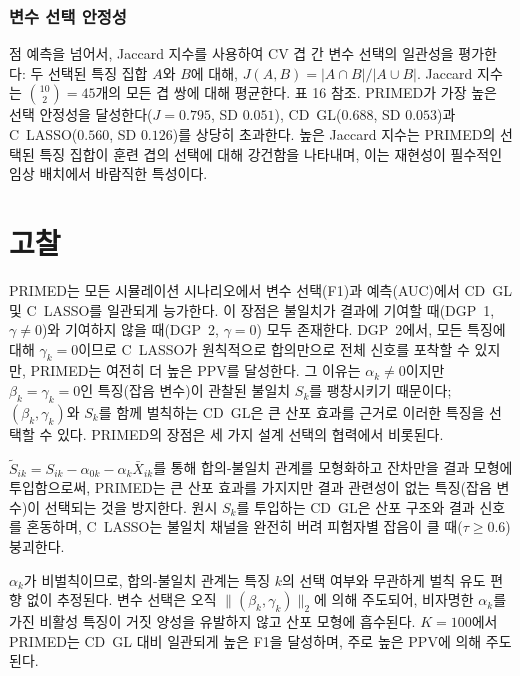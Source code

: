 \documentclass[a4paper,11pt]{article}
\begin{document}
\subsubsection{변수 선택 안정성}

점 예측을 넘어서, Jaccard 지수를 사용하여 CV 겹 간 변수 선택의 일관성을 평가한다: 두 선택된 특징 집합 $A$와 $B$에 대해, $J(A, B) = |A \cap B| / |A \cup B|$.
Jaccard 지수는 $\binom{10}{2} = 45$개의 모든 겹 쌍에 대해 평균한다.
표 16 참조.
PRIMED가 가장 높은 선택 안정성을 달성한다($J = 0.795$, SD $0.051$), CD~GL($0.688$, SD $0.053$)과 C~LASSO($0.560$, SD $0.126$)를 상당히 초과한다.
높은 Jaccard 지수는 PRIMED의 선택된 특징 집합이 훈련 겹의 선택에 대해 강건함을 나타내며, 이는 재현성이 필수적인 임상 배치에서 바람직한 특성이다.

\section{고찰}\label{sec:discussion}

PRIMED는 모든 시뮬레이션 시나리오에서 변수 선택(F1)과 예측(AUC)에서 CD~GL 및 C~LASSO를 일관되게 능가한다.
이 장점은 불일치가 결과에 기여할 때(DGP~1, $\gamma \neq 0$)와 기여하지 않을 때(DGP~2, $\gamma = 0$) 모두 존재한다.
DGP~2에서, 모든 특징에 대해 $\gamma_k = 0$이므로 C~LASSO가 원칙적으로 합의만으로 전체 신호를 포착할 수 있지만, PRIMED는 여전히 더 높은 PPV를 달성한다.
그 이유는 $\alpha_k \neq 0$이지만 $\beta_k = \gamma_k = 0$인 특징(잡음 변수)이 관찰된 불일치 $S_k$를 팽창시키기 때문이다; $(\beta_k, \gamma_k)$와 $S_k$를 함께 벌칙하는 CD~GL은 큰 산포 효과를 근거로 이러한 특징을 선택할 수 있다.
PRIMED의 장점은 세 가지 설계 선택의 협력에서 비롯된다.


$\tilde S_{ik} = S_{ik} - \alpha_{0k} - \alpha_k \bar X_{ik}$를 통해 합의-불일치 관계를 모형화하고 잔차만을 결과 모형에 투입함으로써, PRIMED는 큰 산포 효과를 가지지만 결과 관련성이 없는 특징(잡음 변수)이 선택되는 것을 방지한다.
원시 $S_k$를 투입하는 CD~GL은 산포 구조와 결과 신호를 혼동하며, C~LASSO는 불일치 채널을 완전히 버려 피험자별 잡음이 클 때($\tau \geq 0.6$) 붕괴한다.


$\alpha_k$가 비벌칙이므로, 합의-불일치 관계는 특징 $k$의 선택 여부와 무관하게 벌칙 유도 편향 없이 추정된다.
변수 선택은 오직 $\|(\beta_k, \gamma_k)\|_2$에 의해 주도되어, 비자명한 $\alpha_k$를 가진 비활성 특징이 거짓 양성을 유발하지 않고 산포 모형에 흡수된다.
$K = 100$에서 PRIMED는 CD~GL 대비 일관되게 높은 F1을 달성하며, 주로 높은 PPV에 의해 주도된다.
\end{document}
